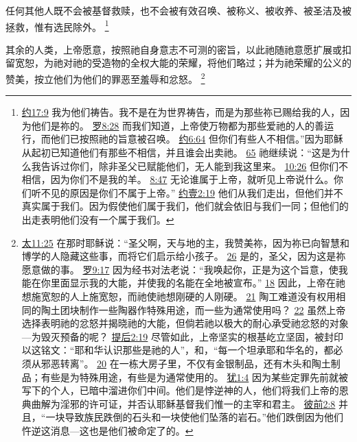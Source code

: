 \documentclass[12pt, a4paper, oneside]{ctexart}
\newcounter{parnum}[section]
\newcommand{\N}{%
   \noindent\refstepcounter{parnum}%
    \makebox[\parindent][l]{\textbf{\arabic{parnum}.}}}
\begin{document}
	任何其他人既不会被基督救赎，也不会被有效召唤、被称义、被收养、被圣洁及被拯救，惟有选民除外。
	\footnote {
		\href{https://biblehub.com/john/17-9.htm}{约17:9} 我为他们祷告。我不是在为世界祷告，而是为那些祢已赐给我的人，因为他们是祢的。
		\href{https://biblehub.com/romans/8-28.htm}{罗8:28} 而我们知道，上帝使万物都为那些爱祂的人的善运行，而他们已按照祂的旨意被召唤。
		\href{https://biblehub.com/john/6-64.htm}{约6:64} 但你们有些人不相信。”因为耶稣从起初已知道他们有那些不相信，并且谁会出卖祂。
		\href{https://biblehub.com/john/6-65.htm}{65} 祂继续说：“这是为什么我告诉过你们，除非圣父已赋能他们，无人能到我这里来。
		\href{https://biblehub.com/john/10-26.htm}{10:26} 但你们不相信，因为你们不是我的羊。
		\href{https://biblehub.com/john/8-47.htm}{8:47} 无论谁属于上帝，就听见上帝说什么。你们听不见的原因是你们不属于上帝。”
		\href{https://biblehub.com/1_john/2-19.htm}{约壹2:19} 他们从我们走出，但他们并不真实属于我们。因为假使他们属于我们，他们就会依旧与我们一同；但他们的出走表明他们没有一个属于我们。
	}

\N 其余的人类，上帝愿意，按照祂自身意志不可测的密旨，以此祂随祂意愿扩展或扣留宽恕，为祂对祂的受造物的全权大能的荣耀，将他们略过；并为祂荣耀的公义的赞美，按立他们为他们的罪恶至羞辱和忿怒。
	\footnote {
		\href{https://biblehub.com/matthew/11-25.htm}{太11:25} 在那时耶稣说：“圣父啊，天与地的主，我赞美祢，因为祢已向智慧和博学的人隐藏这些事，而将它们启示给小孩子。
		\href{https://biblehub.com/matthew/11-26.htm}{26} 是的，圣父，因为这是祢愿意做的事。
		\href{https://biblehub.com/romans/9-17.htm}{罗9:17} 因为经书对法老说：“我唤起你，正是为这个旨意，使我能在你里面显示我的大能，并使我的名能在全地被宣布。”
		\href{https://biblehub.com/romans/9-18.htm}{18} 因此，上帝在祂想施宽恕的人上施宽恕，而祂使祂想刚硬的人刚硬。
		\href{https://biblehub.com/romans/9-21.htm}{21} 陶工难道没有权用相同的陶土团块制作一些陶器作特殊用途，而一些为通常使用吗？
		\href{https://biblehub.com/romans/9-22.htm}{22} 虽然上帝选择表明祂的忿怒并揭晓祂的大能，但倘若祂以极大的耐心承受祂忿怒的对象---为毁灭预备的呢？
		\href{https://biblehub.com/2_timothy/2-19.htm}{提后2:19} 尽管如此，上帝坚实的根基屹立坚固，被封印以这铭文：“耶和华认识那些是祂的人”，和，“每一个坦承耶和华名的，都必须从邪恶转离”。
		\href{https://biblehub.com/2_timothy/2-20.htm}{20} 在一栋大房子里，不仅有金银制品，还有木头和陶土制品；有些是为特殊用途，有些是为通常使用的。
		\href{https://biblehub.com/jude/1-4.htm}{犹1:4} 因为某些定罪先前就被写下的个人，已暗中溜进你们中间。他们是悖逆神的人，他们将我们上帝的恩典曲解为淫邪的许可证，并否认耶稣基督我们惟一的主宰和君主。
		\href{https://biblehub.com/1_peter/2-8.htm}{彼前2:8} 并且，“一块导致族民跌倒的石头和一块使他们坠落的岩石。”他们跌倒因为他们忤逆这消息---这也是他们被命定了的。
	}
\end{document}
